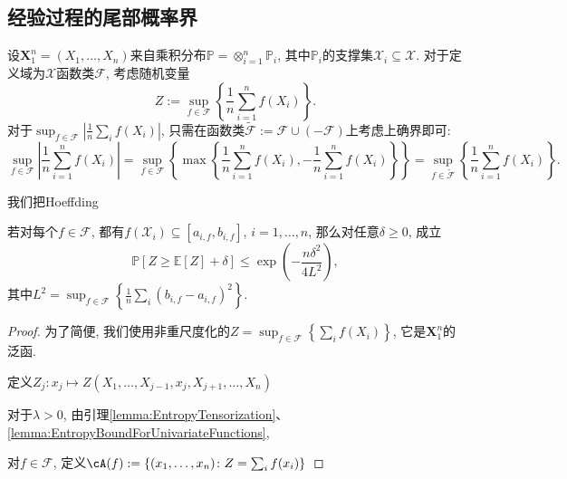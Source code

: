 \subsection{经验过程的尾部概率界}

设$\bm{X}_1^n = (X_1, \dots, X_n)$来自乘积分布$\mathbb{P} = \otimes_{i=1}^n \mathbb{P}_i$, 其中$\mathbb{P}_i$的支撑集$\mathcal{X}_i \subseteq \mathcal{X}$. 
对于定义域为$\mathcal{X}$函数类$\mathscr{F}$, 考虑随机变量
\begin{equation*}
	Z := \sup_{f \in \mathscr{F}} \left\{ \frac{1}{n} \sum_{i=1}^n f(X_i) \right\}. 
\end{equation*}
对于$\sup_{f \in \mathscr{F}} \left| \frac{1}{n} \sum_i f(X_i) \right|$, 只需在函数类$\tilde{\mathscr{F}} := \mathscr{F} \cup (- \mathscr{F})$上考虑上确界即可: 
\begin{equation*}
	\sup_{f \in \mathscr{F}} \left| \frac{1}{n} \sum_{i=1}^n f(X_i) \right|
	= \sup_{f \in \mathscr{F}} \left\{ \max \left\{ \frac{1}{n} \sum_{i=1}^n f(X_i), - \frac{1}{n} \sum_{i=1}^n f(X_i) \right\} \right\} 
	= \sup_{f \in \tilde{\mathscr{F}}} \left\{ \frac{1}{n} \sum_{i=1}^n f(X_i) \right\}.
\end{equation*}

我们把Hoeffding

\begin{theorem}[泛函Hoeffding不等式]
	若对每个$f \in \mathscr{F}$, 都有$f(\mathcal{X}_i) \subseteq  [a_{i, f}, b_{i, f}]$, $i = 1, \dots, n$,  那么对任意$\delta \geq 0$, 成立
	\begin{equation}
		\mathbb{P}[ Z \geq \mathbb{E}[Z] + \delta] 
		\leq \exp \left( - \frac{n \delta^2}{4 L^2} \right), 
	\end{equation}
	其中$L^2 = \sup_{f \in \mathscr{F}} \left\{ \frac{1}{n} \sum_i (b_{i, f} - a_{i, f})^2 \right\}$. 
\end{theorem}

\begin{proof}
	为了简便, 我们使用非重尺度化的$Z = \sup_{f \in \mathscr{F}} \left\{ \sum_i f(X_i) \right\}$, 它是$\bm{X}_1^n$的泛函.  
	
	定义$Z_j \colon x_j \mapsto Z(X_1, \dots, X_{j-1}, x_j, X_{j+1}, \dots, X_n)$
	
	对于$\lambda > 0$, 由引理\ref{lemma:EntropyTensorization}、 \ref{lemma:EntropyBoundForUnivariateFunctions}, 
	
	对$f \in \mathscr{F}$, 定义$\cA(f) := \left\{ (x_1, \dots, x_n) \colon Z = \sum_i f(x_i) \right\}$
\end{proof}


